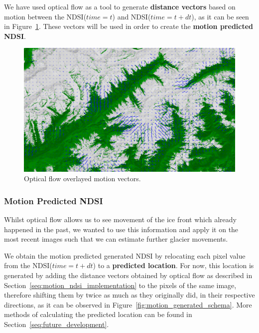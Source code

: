 \documentclass[12pt, a4paper]{report}
\begin{document}
	\par We have used optical flow as a tool to generate \textbf{distance vectors} based on motion between the NDSI(\(time=t\)) and NDSI(\(time=t + dt\)), as it can be seen in Figure~\ref{fig:optical_flow}. These vectors will be used in order to create the \textbf{motion predicted NDSI}. 
	
	\begin{figure}[h!]
		\centering
		\includegraphics[scale=0.32]{../images/LC81940282015363LGN02_NDSI_vectros_small.png}
		\caption{Optical flow overlayed motion vectors.}
		\label{fig:optical_flow}
	\end{figure}

	\subsubsection{Motion Predicted NDSI}
	\label{seq:motion_ndsi_functional}
	
	\par Whilst optical flow allows us to see movement of the ice front which already happened in the past, we wanted to use this information and apply it on the most recent images such that we can estimate further glacier movements.

	\par We obtain the motion predicted generated NDSI by relocating each pixel value from the NDSI(\(time=t + dt\)) to a \textbf{predicted location}. For now, this location is generated by adding the distance vectors obtained by optical flow as described in Section~\ref{seq:motion_ndsi_implementation} to the pixels of the same image, therefore shifting them by twice as much as they originally did, in their respective directions, as it can be observed in Figure~\ref{fig:motion_generated_schema}. More methods of calculating the predicted location can be found in Section~\ref{seq:future_development}.
	
\end{document}

